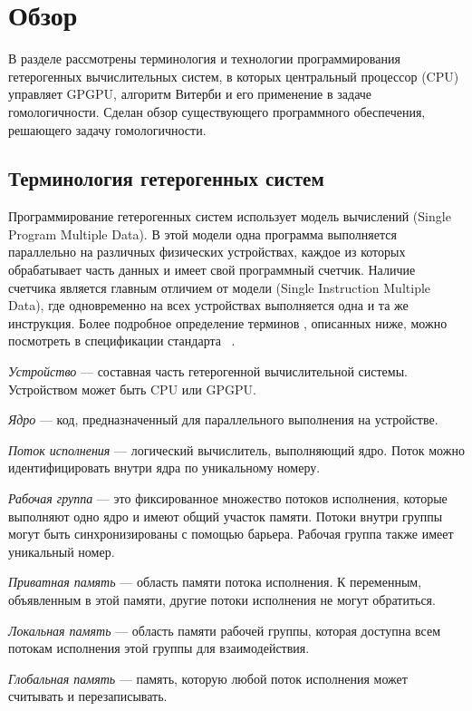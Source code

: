 \section{Обзор}
В разделе рассмотрены терминология и технологии программирования гетерогенных
вычислительных систем, в которых центральный процессор (CPU) управляет GPGPU, 
алгоритм Витерби и его применение в задаче гомологичности.
Сделан обзор существующего программного обеспечения, решающего задачу
гомологичности.

\subsection{Терминология гетерогенных систем}
Программирование гетерогенных систем использует модель вычислений  
(Single Program Multiple Data).
В этой модели одна программа выполняется параллельно на
различных физических устройствах, каждое из которых обрабатывает часть данных и
имеет свой программный счетчик.
Наличие счетчика является главным отличием от модели  (Single
Instruction Multiple Data), где одновременно на всех устройствах выполняется
одна и та же инструкция.
Более подробное определение терминов , описанных ниже, можно 
посмотреть в спецификации стандарта ~\cite{OpenCL_spec}.

\emph{Устройство} --- составная часть гетерогенной вычислительной системы.
Устройством может быть CPU или GPGPU.

\emph{Ядро} --- код, предназначенный для параллельного выполнения на
устройстве.
	
\emph{Поток исполнения} --- логический вычислитель, выполняющий ядро.
Поток можно идентифицировать внутри ядра по уникальному номеру.

\emph{Рабочая группа} --- это фиксированное множество потоков исполнения,
которые выполняют одно ядро и имеют общий участок памяти.
Потоки внутри группы могут быть синхронизированы с помощью барьера.
Рабочая группа также имеет уникальный номер.

\emph{Приватная память} --- область памяти потока исполнения. 
К переменным, объявленным в этой памяти, другие потоки исполнения не могут 
обратиться.

\emph{Локальная память} --- область памяти рабочей группы, которая доступна
всем потокам исполнения этой группы для взаимодействия.

\emph{Глобальная память} --- память, которую любой поток исполнения может считывать и перезаписывать.

